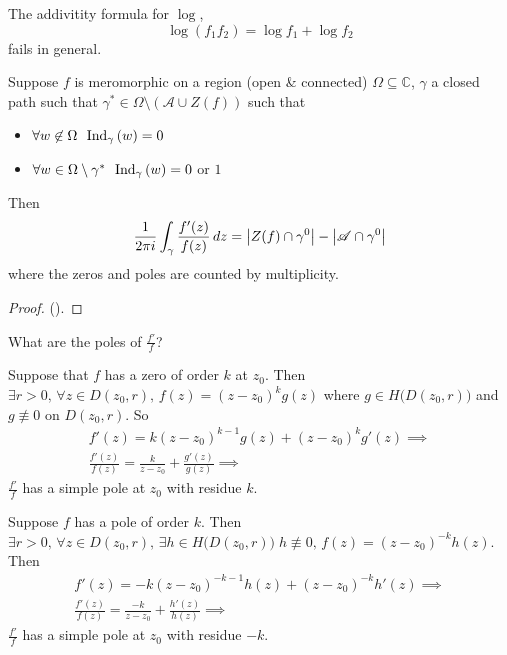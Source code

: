 \documentclass[notoc,notitlepage]{tufte-book}
\begin{document}
\begin{note}
  The addivitity formula for $\log$,
  \begin{equation*}
    \log(f_1 f_2) = \log f_1 + \log f_2
  \end{equation*}
  fails in general.
\end{note}

\begin{thm}\label{thm:argument_principle}
  Suppose $f$ is meromorphic on a region (open \& connected) $\Omega \subseteq \mathbb{C}$, $\gamma$ a closed path such that $\gamma^* \in \Omega \setminus (\mathscr{A} \cup Z(f))$ such that
  \begin{itemize}
    \item $\forall w \not\in \Omega \enspace \operatorname{Ind}_{\gamma}\left( w \right) = 0$
    \item $\forall w \in \Omega \setminus \gamma^* \enspace \operatorname{Ind}_{\gamma}\left( w \right) = 0$ or $1$
  \end{itemize}
  Then
  \begin{equation*}
    \frac{1}{2 \pi i} \int_{\gamma} \frac{f'(z)}{f(z)} \mathop{}\!d{z} = \left|Z(f) \cap \gamma^0\right| - \left|\mathscr{A} \cap \gamma^0\right|
  \end{equation*}
  where the zeros and poles are counted by multiplicity.
\end{thm}

\begin{proof}
  ().
\end{proof}

 What are the poles of $\frac{f'}{f}$?

Suppose that $f$ has a zero of order $k$ at $z_0$. Then $\exists r > 0, \, \forall z \in D(z_0, r), \, f(z) = (z - z_0)^k g(z)$ where $g \in H\big(D(z_0, r)\big)$ and $g \not\equiv 0$ on $D(z_0, r)$. So
\begin{gather*}
  f'(z) = k(z - z_0)^{k - 1} g(z) + (z - z_0)^k g'(z) \implies \\
  \frac{f'(z)}{f(z)} = \frac{k}{z - z_0} + \frac{g'(z)}{g(z)} \implies
\end{gather*}
$\frac{f'}{f}$ has a simple pole at $z_0$ with residue $k$.

Suppose $f$ has a pole of order $k$. Then $\exists r > 0, \, \forall z \in D(z_0, r), \, \exists h \in H\big(D(z_0, r)\big) \; h \not\equiv 0, \, f(z) = (z - z_0)^{-k} h(z)$. Then
\begin{gather*}
  f'(z) = -k (z - z_0)^{-k-1} h(z) + (z - z_0)^{-k} h'(z) \implies \\
  \frac{f'(z)}{f(z)} = \frac{-k}{z - z_0} + \frac{h'(z)}{h(z)} \implies
\end{gather*}
$\frac{f'}{f}$ has a simple pole at $z_0$ with residue $-k$.
\end{document}
